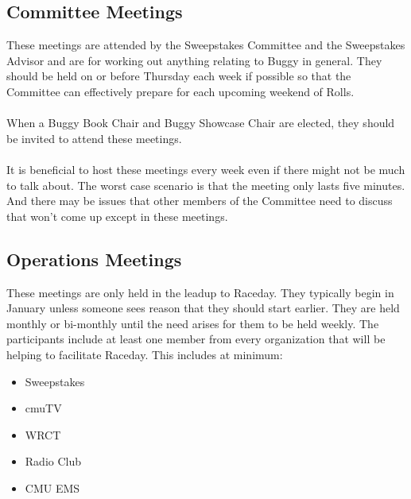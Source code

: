 \subsection{Committee Meetings}
These meetings are attended by the Sweepstakes Committee and the Sweepstakes
Advisor and are for working out anything relating to Buggy in general. They
should be held on or before Thursday each week if possible so that the
Committee can effectively prepare for each upcoming weekend of Rolls.
\\\\
When a Buggy Book Chair and Buggy Showcase Chair are elected, they should be
invited to attend these meetings.
\\\\
It is beneficial to host these meetings every week even if there might not
be much to talk about. The worst case scenario is that the meeting only lasts
five minutes. And there may be issues that other members of the Committee
need to discuss that won't come up except in these meetings.

\subsection{Operations Meetings}
These meetings are only held in the leadup to Raceday. They typically begin
in January unless someone sees reason that they should start earlier. They
are held monthly or bi-monthly until the need arises for them to be held
weekly. The participants include at least one member from every organization
that will be helping to facilitate Raceday. This includes at minimum:
\begin{itemize}
\item Sweepstakes
\item cmuTV
\item WRCT
\item Radio Club
\item CMU EMS
\end{itemize}

